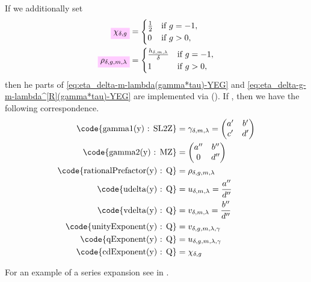 \documentclass{article}
\begin{document}
If we additionally set
\begin{align}
  \defineNotation[chi-delta-g]{\chi_{\delta,g}}
  &=
    \begin{cases}
      \frac{1}{2}
      & \text{if $g=-1$},
      \\
      0
      & \text{if $g>0$},
    \end{cases}
    \label{eq:chi_delta-g}
  \\
  \defineNotation[rho-delta-g-m-lambda]{\rho_{\delta,g,m,\lambda}}
  &=
    \begin{cases}
      \frac{h_{\delta,m,\lambda}}{\delta}
      & \text{if $g=-1$},
      \\
      1
      & \text{if $g>0$},
    \end{cases}
    \label{eq:rho_delta-g-m-lambda}
\end{align}
then he parts of
\eqref{eq:eta_delta-m-lambda(gamma*tau)-YEG} and
\eqref{eq:eta_delta-g-m-lambda^[R](gamma*tau)-YEG} are
implemented via \textcolor{blue}{}
().
If , then we have the following
correspondence.
\begin{align*}
  \text{\code{gamma1(y) : SL2Z}}
  &=
    \gamma_{\delta,m,\lambda} = \begin{pmatrix}a'&b'\\c'&d'\end{pmatrix}
  \\
  \text{\code{gamma2(y) : MZ}}
  &=
    \begin{pmatrix}a''&b''\\0&d''\end{pmatrix}
  \\
  \text{\code{rationalPrefactor(y) : Q}}
  &=
    \rho_{\delta,g,m,\lambda}
  \\
  \text{\code{udelta(y) : Q}}
  &=
    u_{\delta,m,\lambda} = \frac{a''}{d''}
  \\
  \text{\code{vdelta(y) : Q}}
  &=
    v_{\delta,m,\lambda} = \frac{b''}{d''}
  \\
  \text{\code{unityExponent(y) : Q}}
  &=
    v_{\delta,g,m,\lambda,\gamma}
  \\
  \text{\code{qExponent(y) : Q}}
  &=
    u_{\delta,g,m,\lambda,\gamma}
  \\
  \text{\code{cdExponent(y) : Q}}
  &=
    \chi_{\delta,g}
\end{align*}

For an example of a series expansion see
 in
.
\end{document}
